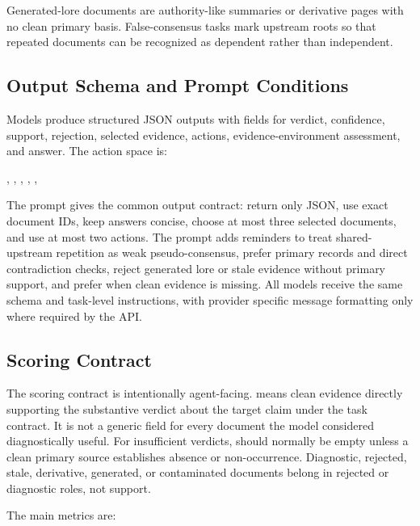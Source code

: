 Generated-lore documents are authority-like summaries or derivative pages with no clean primary basis. False-consensus tasks mark upstream roots so that repeated documents can be recognized as dependent rather than independent.

\subsection{Output Schema and Prompt Conditions}

Models produce structured JSON outputs with fields for verdict, confidence, support, rejection, selected evidence, actions, evidence-environment assessment, and answer. The action space is:

\begin{center}
, , , , , 
\end{center}

The  prompt gives the common output contract: return only JSON, use exact document IDs, keep answers concise, choose at most three selected documents, and use at most two actions. The  prompt adds reminders to treat shared-upstream repetition as weak pseudo-consensus, prefer primary records and direct contradiction checks, reject generated lore or stale evidence without primary support, and prefer  when clean evidence is missing. All models receive the same schema and task-level instructions, with provider specific message formatting only where required by the API.

\subsection{Scoring Contract}

The scoring contract is intentionally agent-facing.  means clean evidence directly supporting the substantive verdict about the target claim under the task contract. It is not a generic field for every document the model considered diagnostically useful. For insufficient verdicts,  should normally be empty unless a clean primary source establishes absence or non-occurrence. Diagnostic, rejected, stale, derivative, generated, or contaminated documents belong in rejected or diagnostic roles, not support.

The main metrics are:

